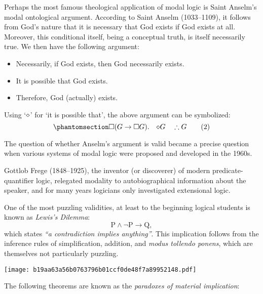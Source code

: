 \documentclass[
  12pt,
  letterpaper,
  DIV=11,
  numbers=noendperiod,
  twoside]{scrreprt}
\providecommand{\tightlist}{%
  \setlength{\itemsep}{0pt}\setlength{\parskip}{0pt}}\usepackage{longtable,booktabs,array}
\let\labelitemito\labelitemi
\newcommand{\oddorevenarrow}{
  \checkoddpage
  \ifoddpage
    \leftarrow
  \else
    \rightarrow
  \fi
}
\theoremstyle{remark}
\begin{document}
Perhaps the most famous theological application of modal logic is Saint
Anselm's modal ontological argument. According to Saint Anselm
(1033--1109), it follows from God's nature that it is necessary that God
exists if God exists at all. Moreover, this conditional itself, being a
conceptual truth, is itself necessarily true. We then have the following
argument:

\renewcommand\labelitemi{}

\begin{itemize}
\tightlist
\item
  Necessarily, if God exists, then God necessarily exists.
\item
  It is possible that God exists.
\item
  Therefore, God (actually) exists.
\end{itemize}

\renewcommand\labelitemi{\labelitemito}

Using `\({\Large\diamond}\)' for `it is possible that', the above
argument can be symbolized:
\begin{equation}\phantomsection\label{eq-modal-2}{
\Box(G\to\Box G).\quad{\Large\diamond} G\quad\therefore G\tag*{(2)}
}\end{equation}

The question of whether Anselm's argument is valid became a precise
question when various systems of modal logic were proposed and developed
in the 1960s.

Gottlob Frege (1848--1925), the inventor (or discoverer) of modern
predicate-quantifier logic, relegated modality to autobiographical
information about the speaker, and for many years logicians only
investigated extensional logic.

One of the most puzzling validities, at least to the beginning logical
students is known as \emph{Lewis's Dilemma}:
\[\mathrm{P}\land\lnot \mathrm{P}\to \mathrm{Q},\] which states
\emph{``a contradiction implies anything''}. This implication follows from the inference
rules of simplification, addition, and \emph{modus tollendo
ponens}, which are
themselves not particularly puzzling.

\texttt{[image: b19aa63a56b0763796b01ccf0de48f7a89952148.pdf]}

The following theorems are known as the \emph{paradoxes of material
implication}:

\renewcommand\labelitemi{$\oddorevenarrow$}
\end{document}
